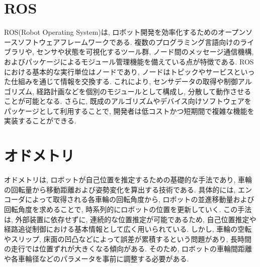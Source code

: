 \section{ROS}
ROS(Robot Operating System)は, ロボット開発を効率化するためのオープンソースソフトウェアフレームワークである. 
複数のプログラミング言語向けのライブラリや, センサや状態を可視化するツール群, ノード間のメッセージ通信機構, およびパッケージによるモジュール管理機能を備えている点が特徴である. 
ROSにおける基本的な実行単位はノードであり, ノードはトピックやサービスといった仕組みを通じて情報を交換する. 
これにより, センサデータの取得や制御アルゴリズム, 経路計画などを個別のモジュールとして構成し, 分散して動作させることが可能となる. 
さらに, 既成のアルゴリズムやデバイス向けソフトウェアをパッケージとして利用することで, 開発者は低コストかつ短期間で複雑な機能を実装することができる. 

\section{オドメトリ}
オドメトリは, ロボットが自己位置を推定するための基礎的な手法であり, 車輪の回転量から移動距離および姿勢変化を算出する技術である. 
具体的には, エンコーダによって取得される各車輪の回転角度から, ロボットの並進移動量および回転角度を求めることで, 
時系列的にロボットの位置を更新していく. 
この手法は, 外部装置に依存せずに, 連続的な位置推定が可能であるため, 自己位置推定や経路追従制御における基本情報として広く用いられている. 
しかし, 車輪の空転やスリップ, 床面の凹凸などによって誤差が累積するという問題があり, 長時間の走行では位置ずれが大きくなる傾向がある. 
そのため, ロボットの車輪間距離や各車輪径などのパラメータを事前に調整する必要がある. 

